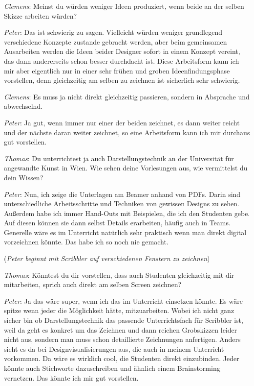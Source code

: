 \medskip \emph{Clemens}: Meinst du würden weniger Ideen produziert, wenn beide an der selben Skizze arbeiten würden?

\medskip \emph{Peter}: Das ist schwierig zu sagen. Vielleicht würden weniger grundlegend verschiedene Konzepte zustande gebracht werden, aber beim gemeinsamen Ausarbeiten werden die Ideen beider Designer sofort in einem Konzept vereint, das dann andererseits schon besser durchdacht ist. Diese Arbeitsform kann ich mir aber eigentlich nur in einer sehr frühen und groben Ideenfindungsphase vorstellen, denn gleichzeitig am selben zu zeichnen ist sicherlich sehr schwierig.

\medskip \emph{Clemens}: Es muss ja nicht direkt gleichzeitig passieren, sondern in Absprache und abwechselnd.

\medskip \emph{Peter}: Ja gut, wenn immer nur einer der beiden zeichnet, es dann weiter reicht und der nächste daran weiter zeichnet, so eine Arbeitsform kann ich mir durchaus gut vorstellen.

\medskip \emph{Thomas}: Du unterrichtest ja auch Darstellungstechnik an der Universität für angewandte Kunst in Wien. Wie sehen deine Vorlesungen aus, wie vermittelst du dein Wissen?

\medskip \emph{Peter}: Nun, ich zeige die Unterlagen am Beamer anhand von \acp{PDF}. Darin sind unterschiedliche Arbeitsschritte und Techniken von gewissen Designs zu sehen. Außerdem habe ich immer Hand-Outs mit Beispielen, die ich den Studenten gebe. Auf diesen können sie dann selbst Details erarbeiten, häufig auch in Teams. Generelle wäre es im Unterricht natürlich sehr praktisch wenn man direkt digital vorzeichnen könnte. Das habe ich so noch nie gemacht.

\medskip (\emph{Peter beginnt mit Scribbler auf verschiedenen Fenstern zu zeichnen})

\medskip \emph{Thomas}: Könntest du dir vorstellen, dass auch Studenten gleichzeitig mit dir mitarbeiten, sprich auch direkt am selben Screen zeichnen?

\medskip \emph{Peter}: Ja das wäre super, wenn ich das im Unterricht einsetzen könnte. Es wäre spitze wenn jeder die Möglichkeit hätte, mitzuarbeiten. Wobei ich nicht ganz sicher bin ob Darstellungstechnik das passende Unterrichtsfach für Scribbler ist, weil da geht es konkret um das Zeichnen und dann reichen Grobskizzen leider nicht aus, sondern man muss schon detaillierte Zeichnungen anfertigen. Anders sieht es da bei Designvisualisierungen aus, die auch in meinem Unterricht vorkommen. Da wäre es wirklich cool, die Studenten direkt einzubinden. Jeder könnte auch Stichworte dazuschreiben und ähnlich einem Brainstorming vernetzen. Das könnte ich mir gut vorstellen. 

